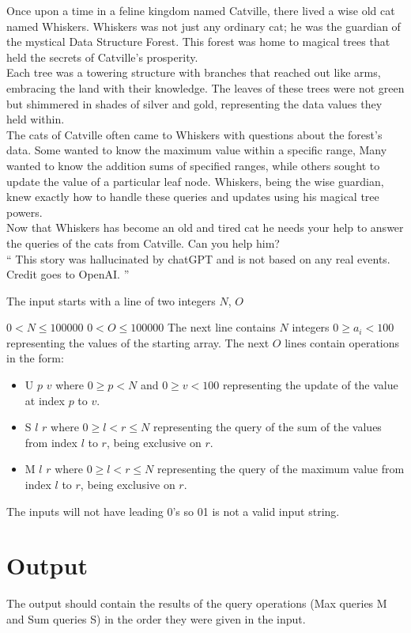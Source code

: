 

\noindent Once upon a time in a feline kingdom named Catville, there lived a wise old cat named Whiskers. Whiskers was not just any ordinary cat; he was the guardian of the mystical Data Structure Forest. This forest was home to magical trees that held the secrets of Catville's prosperity.
\\

\noindent Each tree was a towering structure with branches that reached out like arms, embracing the land with their knowledge. The leaves of these trees were not green but shimmered in shades of silver and gold, representing the data values they held within.
\\

\noindent The cats of Catville often came to Whiskers with questions about the forest's data. Some wanted to know the maximum value within a specific range, Many wanted to know the addition sums of specified ranges, while others sought to update the value of a particular leaf node. Whiskers, being the wise guardian, knew exactly how to handle these queries and updates using his magical tree powers.
\\

\noindent Now that Whiskers has become an old and tired cat he needs your help to answer the queries of the cats from Catville. Can you help him?
\\

\noindent `` This story was hallucinated by chatGPT and is not based on any real events. Credit goes to OpenAI. '' 

{\setlength{\parindent}{0cm}
}
\begin{Input}
The input starts with a line of two integers $N$, $O$
\newline
{\setlength{\parindent}{0cm}
$0 < N \leq 100 000$
\newline
$0 < O \leq 100 000$ 
\newline
The next line contains $N$ integers $0 \geq a_i < 100$ representing the values of the starting array.  
\newline
The next $O$ lines contain operations in the form:
\begin{itemize}
    \item U $p$ $v$ where $0 \geq p < N$ and $0 \geq v < 100$ representing the update of the value at index $p$ to $v$.
    \item S $l$ $r$ where $0 \geq l < r \leq N$ representing the query of the sum of the values from index $l$ to $r$, being exclusive on $r$.
    \item M $l$ $r$ where $0 \geq l < r \leq N$ representing the query of the maximum value from index $l$ to $r$, being exclusive on $r$.
\end{itemize}
}
{\setlength{\parindent}{0cm}
The inputs will not have leading 0's so 01 is not a valid input string.
}
\end{Input}

\section*{Output}
The output should contain the results of the query operations (Max queries M and Sum queries S) in the order they were given in the input. 
{\setlength{\parindent}{0cm}
}
